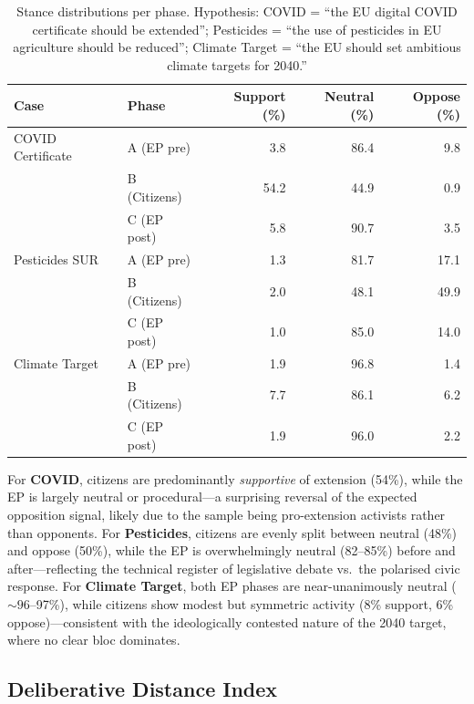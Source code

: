 \documentclass[sigconf,natbib]{acmart}
\begin{document}
\begin{table}[h]
\centering
\small
\begin{tabular}{llrrr}
\toprule
\textbf{Case} & \textbf{Phase} & \textbf{Support (\%)} & \textbf{Neutral (\%)} & \textbf{Oppose (\%)} \\
\midrule
COVID Certificate & A (EP pre)   & 3.8  & 86.4 & 9.8  \\
                  & B (Citizens) & 54.2 & 44.9 & 0.9  \\
                  & C (EP post)  & 5.8  & 90.7 & 3.5  \\
\midrule
Pesticides SUR    & A (EP pre)   & 1.3  & 81.7 & 17.1 \\
                  & B (Citizens) & 2.0  & 48.1 & 49.9 \\
                  & C (EP post)  & 1.0  & 85.0 & 14.0 \\
\midrule
Climate Target    & A (EP pre)   & 1.9  & 96.8 & 1.4  \\
                  & B (Citizens) & 7.7  & 86.1 & 6.2  \\
                  & C (EP post)  & 1.9  & 96.0 & 2.2  \\
\bottomrule
\end{tabular}
\caption{Stance distributions per phase. Hypothesis: COVID = ``the EU digital COVID certificate should be extended''; Pesticides = ``the use of pesticides in EU agriculture should be reduced''; Climate Target = ``the EU should set ambitious climate targets for 2040.''}
\label{tab:stance}
\end{table}

\noindent
For \textbf{COVID}, citizens are predominantly \textit{supportive} of extension (54\%), while the EP
is largely neutral or procedural---a surprising reversal of the expected opposition signal,
likely due to the sample being pro-extension activists rather than opponents.
For \textbf{Pesticides}, citizens are evenly split between neutral (48\%) and oppose (50\%),
while the EP is overwhelmingly neutral (82--85\%) before and after---reflecting the technical
register of legislative debate vs.\ the polarised civic response.
For \textbf{Climate Target}, both EP phases are near-unanimously neutral (${\sim}96$--97\%),
while citizens show modest but symmetric activity (8\% support, 6\% oppose)---consistent
with the ideologically contested nature of the 2040 target, where no clear bloc dominates.

\subsection{Deliberative Distance Index}
\end{document}
